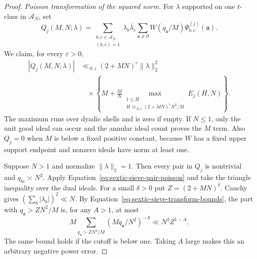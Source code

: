 \documentclass[11pt,a4paper]{article}
\numberwithin{equation}{section}
\numberwithin{figure}{section}
\theoremstyle{definition}
\theoremstyle{remark}
\begin{document}
\begin{proof}
\medskip\noindent\emph{Poisson transformation of the squared norm.}
For $\lambda$ supported on one $t$-class in $\mathcal A_N$, set
\[
 Q_j(M,N;\lambda)=
 \sum_{\substack{b,c\in\mathcal A_N\\(b,c)=1}}
   \lambda_b\overline{\lambda_c}
   \sum_{\mathfrak a\ne0}W(q_{\mathfrak a}/M)
                         \Psi_{b,c}^{(j)}(\mathfrak a).
\]
We claim, for every $\varepsilon>0$,
\begin{equation}\label{eq:sextic-sieve-pair-norm}
 \begin{split}
 |Q_j(M,N;\lambda)|
 &\ll_{S,\varepsilon}(2+MN)^\varepsilon\|\lambda\|_2^2\\
 &\quad\times
 \left\{M+\frac MN
   \max_{\substack{1\le H\\
       H\ll_{S,\varepsilon}(2+MN)^\varepsilon N^2/M}}
       E_j(H,N)\right\}.
 \end{split}
\end{equation}
The maximum runs over dyadic shells and is zero if empty.  If $N\le1$,
only the unit good ideal can occur and the annular ideal count proves the
$M$ term.  Also $Q_j=0$ when $M$ is below a fixed positive constant,
because $W$ has a fixed upper support endpoint and nonzero ideals have norm
at least one.

Suppose $N>1$ and normalize $\|\lambda\|_2=1$.  Then every pair in $Q_j$
is nontrivial and $q_{bc}\asymp N^2$.  Apply
Equation~\eqref{eq:sextic-sieve-pair-poisson} and take the triangle
inequality over the dual ideals.  For a small $\delta>0$ put
$Z=(2+MN)^\delta$.  Cauchy gives $(\sum_b|\lambda_b|)^2\ll N$.
By Equation~\eqref{eq:sextic-sieve-transform-bounds}, the part with
$q_{\mathfrak a}>ZN^2/M$ is, for any $A>1$, at most
\[
 M\sum_{q_{\mathfrak a}>ZN^2/M}(Mq_{\mathfrak a}/N^2)^{-A}
 \ll N^2Z^{1-A}.
\]
The same bound holds if the cutoff is below one.  Taking $A$ large makes
this an arbitrary negative power error.


\end{proof}
\end{document}
